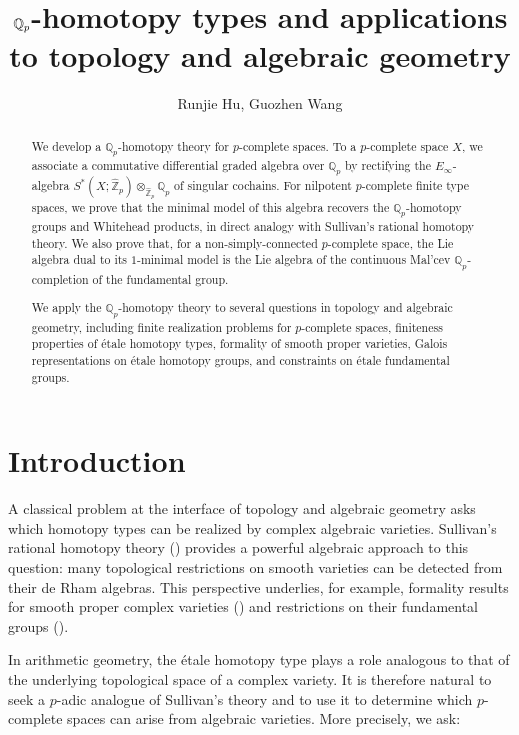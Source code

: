 \documentclass[11pt]{amsart}
\title{$\QQ_p$-homotopy types and applications to topology and algebraic geometry}
\author{Runjie Hu, Guozhen Wang}
\date{}
\theoremstyle{definition}
\numberwithin{equation}{section}
\numberwithin{equation}{section}
\newcommand\QQ{\mathbb{Q}}
\newcommand\ZZ{\mathbb{Z}}
\begin{document}
\maketitle

\begin{abstract}
We develop a $\mathbb Q_p$-homotopy theory for $p$-complete spaces. To a $p$-complete space $X$, we associate a commutative
differential graded algebra over $\QQ_p$ by rectifying the $E_\infty$-algebra $S^*(X;\widehat{\ZZ}_p)\otimes_{\widehat{\ZZ}_p} \QQ_p$ of singular cochains. For nilpotent $p$-complete finite type spaces, we prove that the minimal model of this algebra recovers the $\mathbb Q_p$-homotopy groups and Whitehead products, in direct analogy with Sullivan's rational homotopy theory. We also prove that, for a non-simply-connected $p$-complete space, the Lie algebra dual to its $1$-minimal model is the Lie algebra of the continuous Mal'cev $\QQ_p$-completion of the fundamental group. 

We apply the $\mathbb Q_p$-homotopy theory to several questions in topology and algebraic geometry, including finite realization problems for $p$-complete spaces, finiteness properties of étale homotopy types, formality of smooth proper varieties, Galois representations on étale homotopy groups, and constraints on étale fundamental groups.
\end{abstract}

\section*{Introduction}

A classical problem at the interface of topology and algebraic geometry asks which homotopy types can be realized by complex algebraic varieties.  Sullivan’s rational homotopy theory (\cite{Sullivan-rational-homotopy}) provides a powerful algebraic approach to this question: many topological restrictions on smooth varieties can be detected from their de Rham algebras. This perspective underlies, for example, formality results for smooth proper complex varieties (\cite{Deligne-Griffiths-Morgan-Sullivan-formality}) and restrictions on their fundamental groups (\cite{Morgan-hodge-theory}).

In arithmetic geometry, the \'etale homotopy type plays a role analogous to that of the underlying topological space of a complex variety. It is therefore natural to seek a $p$-adic analogue of Sullivan’s theory and to use it to determine which $p$-complete spaces can arise from algebraic varieties. More precisely, we ask:
\end{document}
